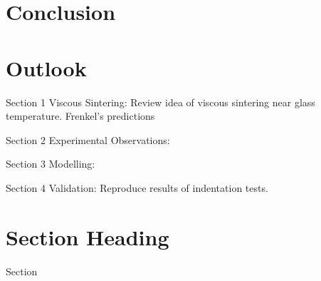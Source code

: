 \documentclass[graybox, envcountchap]{svmult}
\begin{document}
\section{Conclusion}

\section{Outlook}






Section 1 Viscous Sintering: 
Review idea of viscous sintering near glass temperature. Frenkel's predictions

Section 2 Experimental Observations: 


Section 3 Modelling: 

Section 4 Validation:
Reproduce results of indentation tests.

\section{Section Heading}
\label{sec:1}
Section



\end{document}
